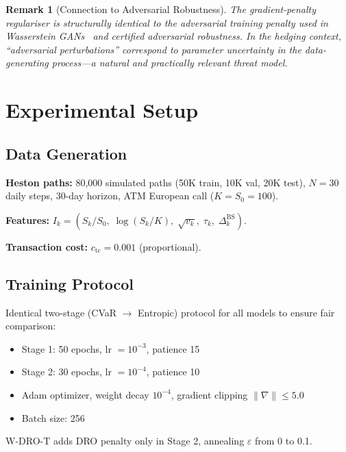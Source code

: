 \documentclass[11pt]{article}
\newtheorem{remark}[theorem]{Remark}
\begin{document}
\begin{remark}[Connection to Adversarial Robustness]
The gradient-penalty regulariser is structurally identical to the adversarial training penalty used in Wasserstein GANs~\citep{gao2023distributionally} and certified adversarial robustness.  In the hedging context, ``adversarial perturbations'' correspond to parameter uncertainty in the data-generating process---a natural and practically relevant threat model.
\end{remark}

\section{Experimental Setup}
\label{sec:experiments}

\subsection{Data Generation}

\textbf{Heston paths:} 80,000 simulated paths (50K train, 10K val, 20K test), $N = 30$ daily steps, 30-day horizon, ATM European call ($K = S_0 = 100$).

\textbf{Features:} $I_k = (S_k/S_0,\; \log(S_k/K),\; \sqrt{v_k},\; \tau_k,\; \Delta_k^{\mathrm{BS}})$.

\textbf{Transaction cost:} $c_{\mathrm{tc}} = 0.001$ (proportional).

\subsection{Training Protocol}

Identical two-stage (CVaR $\to$ Entropic) protocol for all models to ensure fair comparison:
\begin{itemize}[noitemsep]
    \item Stage 1: 50 epochs, lr $= 10^{-3}$, patience 15
    \item Stage 2: 30 epochs, lr $= 10^{-4}$, patience 10
    \item Adam optimizer, weight decay $10^{-4}$, gradient clipping $\|\nabla\| \leq 5.0$
    \item Batch size: 256
\end{itemize}

W-DRO-T adds DRO penalty only in Stage 2, annealing $\varepsilon$ from 0 to 0.1.
\end{document}
